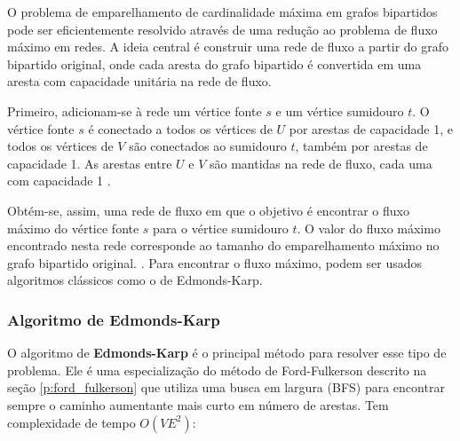 O problema de emparelhamento de cardinalidade máxima em grafos bipartidos pode ser eficientemente resolvido através de uma redução ao problema de fluxo máximo em redes. A ideia central é construir uma rede de fluxo a partir do grafo bipartido original, onde cada aresta do grafo bipartido é convertida em uma aresta com capacidade unitária na rede de fluxo. \cite{lawler}

Primeiro, adicionam-se à rede um vértice fonte $s$ e um vértice sumidouro $t$. O vértice fonte $s$ é conectado a todos os vértices de $U$ por arestas de capacidade 1, e todos os vértices de $V$ são conectados ao sumidouro $t$, também por arestas de capacidade 1. As arestas entre $U$ e $V$ são mantidas na rede de fluxo, cada uma com capacidade 1 \cite{halim}.

Obtém-se, assim, uma rede de fluxo em que o objetivo é encontrar o fluxo máximo do vértice fonte $s$ para o vértice sumidouro $t$. O valor do fluxo máximo encontrado nesta rede corresponde ao tamanho do emparelhamento máximo no grafo bipartido original. \cite{lawler}. Para encontrar o fluxo máximo, podem ser usados algoritmos clássicos como o de Edmonds-Karp.

\subsubsection{Algoritmo de Edmonds-Karp}
\label{p:edmonds-karp}

O algoritmo de \textbf{Edmonds-Karp} é o principal método para resolver esse tipo de problema. Ele é uma especialização do método de Ford-Fulkerson descrito na seção \ref{p:ford_fulkerson} que utiliza uma busca em largura (BFS) para encontrar sempre o caminho aumentante mais curto em número de arestas. Tem complexidade de tempo $O(VE^2)$:

